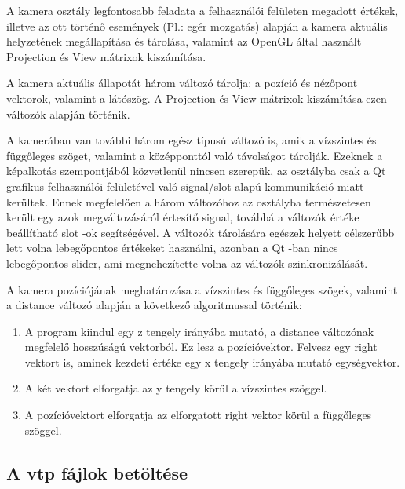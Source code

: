 A kamera osztály legfontosabb feladata a felhasználói felületen megadott értékek, 
illetve az ott történő események (Pl.: egér mozgatás) alapján 
a kamera aktuális helyzetének megállapítása és tárolása, 
valamint az OpenGL által használt Projection és View mátrixok kiszámítása.

A kamera aktuális állapotát három változó tárolja: 
a pozíció és nézőpont vektorok, valamint a látószög. 
A Projection és View mátrixok kiszámítása ezen változók alapján történik. 
 
A kamerában van további három egész típusú változó is, 
amik a vízszintes és függőleges szöget, 
valamint a középponttól való távolságot tárolják. 
Ezeknek a képalkotás szempontjából közvetlenül nincsen szerepük, 
az osztályba csak a Qt grafikus felhasználói felületével 
való signal/slot alapú kommunikáció miatt kerültek. 
Ennek megfelelően a három változóhoz az osztályba természetesen került 
egy azok megváltozásáról értesítő signal, 
továbbá a változók értéke beállítható slot -ok segítségével. 
A változók tárolására egészek helyett célszerűbb 
lett volna lebegőpontos értékeket használni, 
azonban a Qt -ban nincs lebegőpontos slider, ami megnehezítette volna az változók szinkronizálását. 

A kamera pozíciójának meghatározása a vízszintes és függőleges szögek, 
valamint a {\ttfamily distance} változó alapján a következő algoritmussal történik:
\begin{enumerate}
\item
A program kiindul egy z tengely irányába mutató, 
a {\ttfamily distance} változónak megfelelő hosszúságú vektorból. 
Ez lesz a pozícióvektor. 
Felvesz egy {\ttfamily right} vektort is, 
aminek kezdeti értéke egy x tengely irányába mutató egységvektor. 
\item
A két vektort elforgatja az y tengely körül a vízszintes szöggel.
\item
A pozícióvektort elforgatja az elforgatott {\ttfamily right} vektor körül 
a függőleges szöggel.
\end{enumerate}

\subsection{A vtp fájlok betöltése}

